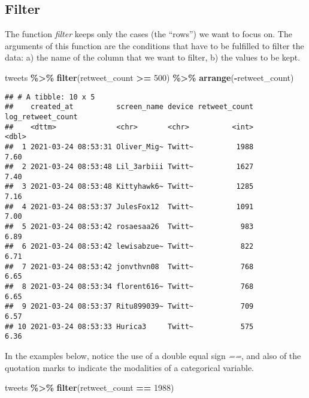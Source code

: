 \documentclass[
]{article}
\newenvironment{Shaded}{\begin{snugshade}}{\end{snugshade}}
\newcommand{\DecValTok}[1]{\textcolor[rgb]{0.00,0.00,0.81}{#1}}
\newcommand{\FunctionTok}[1]{\textcolor[rgb]{0.13,0.29,0.53}{\textbf{#1}}}
\newcommand{\NormalTok}[1]{#1}
\newcommand{\SpecialCharTok}[1]{\textcolor[rgb]{0.81,0.36,0.00}{\textbf{#1}}}
\begin{document}
\subsection{Filter}\label{filter}

The function \emph{filter} keeps only the cases (the ``rows'') we want to focus on. The arguments of this function are the conditions that have to be fulfilled to filter the data: a) the name of the column that we want to filter, b) the values to be kept.

\begin{Shaded}
\begin{Highlighting}[]
\NormalTok{tweets }\SpecialCharTok{\%\textgreater{}\%}
  \FunctionTok{filter}\NormalTok{(retweet\_count }\SpecialCharTok{\textgreater{}=} \DecValTok{500}\NormalTok{) }\SpecialCharTok{\%\textgreater{}\%}
  \FunctionTok{arrange}\NormalTok{(}\SpecialCharTok{{-}}\NormalTok{retweet\_count)}
\end{Highlighting}
\end{Shaded}

\begin{verbatim}
## # A tibble: 10 x 5
##    created_at          screen_name device retweet_count log_retweet_count
##    <dttm>              <chr>       <chr>          <int>             <dbl>
##  1 2021-03-24 08:53:31 Oliver_Mig~ Twitt~          1988              7.60
##  2 2021-03-24 08:53:48 Lil_3arbiii Twitt~          1627              7.40
##  3 2021-03-24 08:53:48 Kittyhawk6~ Twitt~          1285              7.16
##  4 2021-03-24 08:53:37 JulesFox12  Twitt~          1091              7.00
##  5 2021-03-24 08:53:42 rosaesaa26  Twitt~           983              6.89
##  6 2021-03-24 08:53:42 lewisabzue~ Twitt~           822              6.71
##  7 2021-03-24 08:53:42 jonvthvn08  Twitt~           768              6.65
##  8 2021-03-24 08:53:34 florent616~ Twitt~           768              6.65
##  9 2021-03-24 08:53:37 Ritu899039~ Twitt~           709              6.57
## 10 2021-03-24 08:53:33 Hurica3     Twitt~           575              6.36
\end{verbatim}

In the examples below, notice the use of a double equal sign \emph{==}, and also of the quotation marks to indicate the modalities of a categorical variable.

\begin{Shaded}
\begin{Highlighting}[]
\NormalTok{tweets }\SpecialCharTok{\%\textgreater{}\%}
  \FunctionTok{filter}\NormalTok{(retweet\_count }\SpecialCharTok{==} \DecValTok{1988}\NormalTok{) }
\end{Highlighting}
\end{Shaded}
\end{document}
